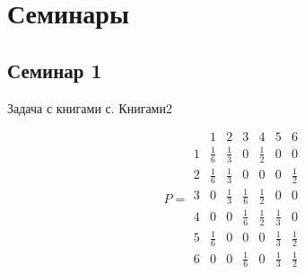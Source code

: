 \section{Семинары}

\subsection{Семинар 1}

Задача с книгами с.
Книгами2

\[
	P =
	\begin{array}{c|cccccc}
		  & 1            & 2            & 3            & 4            & 5            & 6            \\ \hline
		1 & \tfrac{1}{6} & \tfrac{1}{3} & 0            & \tfrac{1}{2} & 0            & 0            \\
		2 & \tfrac{1}{6} & \tfrac{1}{3} & 0            & 0            & 0            & \tfrac{1}{2} \\
		3 & 0            & \tfrac{1}{3} & \tfrac{1}{6} & \tfrac{1}{2} & 0            & 0            \\
		4 & 0            & 0            & \tfrac{1}{6} & \tfrac{1}{2} & \tfrac{1}{3} & 0            \\
		5 & \tfrac{1}{6} & 0            & 0            & 0            & \tfrac{1}{3} & \tfrac{1}{2} \\
		6 & 0            & 0            & \tfrac{1}{6} & 0            & \tfrac{1}{3} & \tfrac{1}{2}
	\end{array}
\]